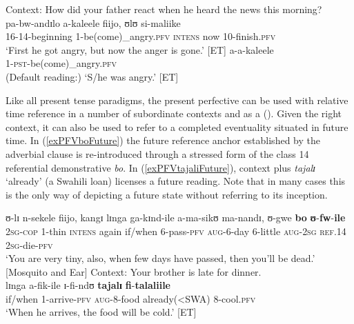 \begin{exe}
\ex \label{exPRSPFVInchoativeDynamic} Context: How did your father react when he heard the news this morning?\\
\gll pa-bw-andɪlo a-kaleele fiijo, ʊlʊ si-maliike\\
16-14-beginning 1-be(come)\_angry.\textsc{pfv} \textsc{intens} now 10-finish.\textsc{pfv}\\
\glt `First he got angry, but now the anger is gone.' [ET]
\ex \label{exPRSPFVnotPSTstate} \gll a-a-kaleele\\
1-\textsc{pst}-be(come)\_angry.\textsc{pfv}\\
\glt (Default reading:) \lq S/he was angry.' [ET]
\end{exe}

Like all present tense paradigms, the present perfective can be used with relative time reference in a number of subordinate contexts and as a  (). Given the right context, it can also be used to refer to a completed eventuality situated in future time. In (\ref{exPFVboFuture}) the future reference anchor established by the adverbial clause is re-introduced through a stressed form of the class 14 referential demonstrative \textit{bo}. In (\ref{exPFVtajaliFuture}), context plus \textit{tajalɪ} \lq already' (a Swahili loan) licenses a future reading. Note that in many cases this is the only way of depicting a future state without referring to its inception.

\begin{exe}
\ex \label{exPFVboFuture}
\gll ʊ-lɪ n-sekele fiijo, kangɪ lɪnga ga-kɪnd-ile a-ma-sikʊ ma-nandɪ, ʊ-gwe \textbf{bo} \textbf{ʊ}-\textbf{fw}-\textbf{ile}\\
\textsc{2sg}-\textsc{cop} 1-thin \textsc{intens} again if/when 6-pass-\textsc{pfv} \textsc{aug}-6-day 6-little \textsc{aug}-\textsc{2sg} \textsc{ref.14} \textsc{2sg}-die-\textsc{pfv}\\
\glt `‎‎You are very tiny, also, when few days have passed, then you'll be dead.' [Mosquito and Ear]
\ex \label{exPFVtajaliFuture} Context: Your brother is late for dinner.\\
\gll lɪnga a-fik-ile ɪ-fi-ndʊ \textbf{tajalɪ} \textbf{fi}-\textbf{talaliile}\\
if/when 1-arrive-\textsc{pfv} \textsc{aug}-8-food already(<SWA) 8-cool.\textsc{pfv}\\
\glt `When he arrives, the food will be cold.' [ET]
\end{exe}

